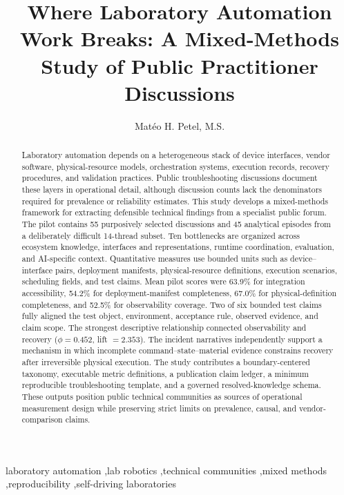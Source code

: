\documentclass[preprint,12pt]{elsarticle}
\begin{document}
\begin{frontmatter}

\title{Where Laboratory Automation Work Breaks: A Mixed-Methods Study of Public Practitioner Discussions}

\author[csrct,sentinelops]{Mat\'eo H. Petel, M.S.}

\begin{abstract}
Laboratory automation depends on a heterogeneous stack of device interfaces, vendor software, physical-resource models, orchestration systems, execution records, recovery procedures, and validation practices. Public troubleshooting discussions document these layers in operational detail, although discussion counts lack the denominators required for prevalence or reliability estimates. This study develops a mixed-methods framework for extracting defensible technical findings from a specialist public forum. The pilot contains 55 purposively selected discussions and 45 analytical episodes from a deliberately difficult 14-thread subset. Ten bottlenecks are organized across ecosystem knowledge, interfaces and representations, runtime coordination, evaluation, and AI-specific context. Quantitative measures use bounded units such as device--interface pairs, deployment manifests, physical-resource definitions, execution scenarios, scheduling fields, and test claims. Mean pilot scores were 63.9\% for integration accessibility, 54.2\% for deployment-manifest completeness, 67.0\% for physical-definition completeness, and 52.5\% for observability coverage. Two of six bounded test claims fully aligned the test object, environment, acceptance rule, observed evidence, and claim scope. The strongest descriptive relationship connected observability and recovery ($\phi=0.452$, lift $=2.353$). The incident narratives independently support a mechanism in which incomplete command--state--material evidence constrains recovery after irreversible physical execution. The study contributes a boundary-centered taxonomy, executable metric definitions, a publication claim ledger, a minimum reproducible troubleshooting template, and a governed resolved-knowledge schema. These outputs position public technical communities as sources of operational measurement design while preserving strict limits on prevalence, causal, and vendor-comparison claims.
\end{abstract}

\begin{keyword}
laboratory automation \sep lab robotics \sep technical communities \sep mixed methods \sep reproducibility \sep self-driving laboratories
\end{keyword}
\end{frontmatter}
\end{document}
